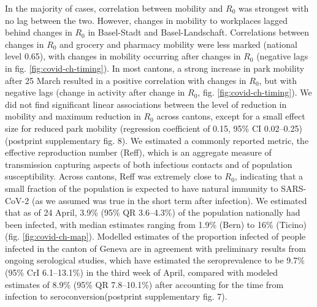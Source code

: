 In the majority of cases, correlation between mobility and $R_0$ was strongest with no lag between the two. However, changes in mobility to workplaces lagged behind changes in $R_0$ in Basel-Stadt and Basel-Landschaft. Correlations between changes in $R_0$ and grocery and pharmacy mobility were less marked (national level 0.65), with changes in mobility occurring after changes in $R_0$ (negative lags in fig. \ref{fig:covid-ch-timing}). In most cantons, a strong increase in park mobility after 25 March resulted in a positive correlation with changes in $R_0$, but with negative lags (change in activity after change in $R_0$, fig. \ref{fig:covid-ch-timing}). We did not find significant linear associations between the level of reduction in mobility and maximum reduction in $R_0$ across cantons, except for a small effect size for reduced park mobility (regression coefficient of 0.15, 95\% CI 0.02–0.25) (postprint supplementary fig. 8). We estimated a commonly reported metric, the effective reproduction number (Reff), which is an aggregate measure of transmission capturing aspects of both infectious contacts and of population susceptibility. Across cantons, Reff was extremely close to $R_0$, indicating that a small fraction of the population is expected to have natural immunity to SARS-CoV-2 (as we assumed was true in the short term after infection). We estimated that as of 24 April, 3.9\% (95\% QR 3.6–4.3\%) of the population nationally had been infected, with median estimates ranging from 1.9\% (Bern) to 16\% (Ticino) (fig. \ref{fig:covid-ch-map}). Modelled estimates of the proportion infected of people infected in the canton of Geneva are in agreement with preliminary results from ongoing serological studies, which have estimated the seroprevalence to be 9.7\% (95\% CrI 6.1–13.1\%) in the third week of April\cite{Stringhini:RepeatedSeroprevalenceAntiSARSCoV2:2020}, compared with modeled estimates of 8.9\% (95\% QR 7.8–10.1\%) after accounting for the time from infection to seroconversion\cite{Wolfel:VirologicalAssessmentHospitalized:2020}(postprint supplementary fig. 7).

